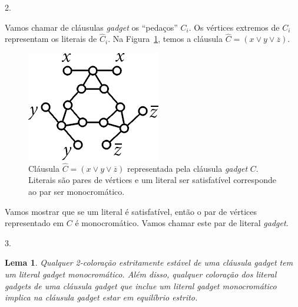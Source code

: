 \documentclass{beamer}
\newcommand{\cls}{\hat{C}}
\newcommand{\ov}{\overline}
\theoremstyle{plain}
\newtheorem{lemma-cnt}{Lema}
\begin{document}
\begin{frame}

  {\color{blue} 2.}

  Vamos chamar de cláusulas \textit{gadget} os ``pedaços'' $C_i$. Os vértices extremos de $C_i$
  representam os literais de $\cls_i$. Na Figura~\ref{fig:cls}, temos a cláusula $\cls=(x\vee
  y\vee\ov{z})$.
  \begin{figure}[h]
    \centering\includegraphics[scale=0.4]{imgs/clause_gadget.png}
    \captionsetup{justification=raggedright}
    \caption{\label{fig:cls} Cláusula $\cls=(x\vee y\vee\ov{z})$ representada pela cláusula
    \textit{gadget} $C$. Literais são pares de vértices e um literal ser satisfatível corresponde
    ao par ser monocromático.}
  \end{figure}
  \vspace{-0.3in}
  Vamos mostrar que se um literal é satisfatível, então o par de vértices representado em $C$ é
  monocromático. Vamos chamar este par de literal \textit{gadget}.

\end{frame}

\begin{frame}

  {\color{blue} 3.}
  \begin{lemma-cnt}
    Qualquer 2-coloração estritamente estável de uma cláusula \textit{gadget} tem um literal
    \textit{gadget} monocromático. Além disso, qualquer coloração dos literal \textit{gadgets} de
    uma cláusula \textit{gadget} que inclue um literal \textit{gadget} monocromático implica na
    cláusula \textit{gadget} estar em equilíbrio estrito.
  \end{lemma-cnt}
\end{frame}
\end{document}

